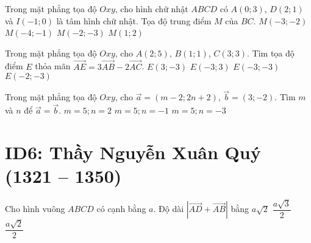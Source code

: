 \begin{ex}%
	Trong mặt phẳng tọa độ $Oxy$, cho hình chữ nhật $ABCD$ có $A(0; 3)$, $D(2; 1)$ và  $I(-1; 0)$ là tâm hình chữ nhật. Tọa độ trung điểm $M$ của $BC$.
	\choice
	{\True $M(-3; -2)$}
	{$M(-4; -1)$}
	{$M(-2; -3)$}
	{$M(1; 2)$}
\end{ex}
\begin{ex}%
	Trong mặt phẳng tọa độ $Oxy$, cho $A(2; 5)$, $B(1; 1)$, $C(3; 3)$. Tìm tọa độ điểm $E$ thỏa mãn $\vec{AE} = 3\vec{AB} - 2\vec{AC}$.
	\choice
	{$E(3; -3)$}
	{$E(-3; 3)$}
	{\True $E(-3; -3)$}
	{$E(-2; -3)$}
\end{ex}
\begin{ex}%
	Trong mặt phẳng tọa độ $Oxy$, cho $\vec{a} = (m - 2; 2n + 2)$, $\vec{b} = (3; -2)$. Tìm $m$ và $n$ để $\vec{a} = \vec{b}$.
	{$m = 5; n = 2$}
	{$m =5; n = -1$}
	{$m = 5; n = -3$}
\end{ex}



\section*{ID6: Thầy Nguyễn Xuân Quý (1321 -- 1350)}
\begin{ex}%
	Cho hình vuông $ABCD$ có cạnh bằng $a$. Độ dài $\left|\vec{AD} + \vec{AB}\right|$ bằng
	{\True $a\sqrt{2}$}
	{$\dfrac{a\sqrt{3}}{2}$}
	{$\dfrac{a\sqrt{2}}{2}$}
\end{ex}

